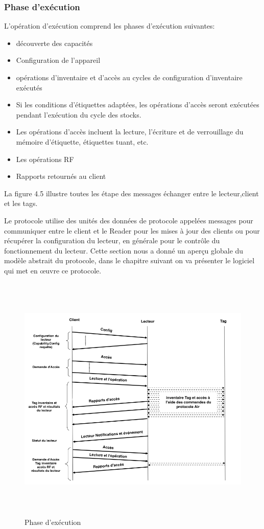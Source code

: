 \documentclass[11pt, a4paper, twoside]{book}
\begin{document}
\subsubsection{Phase d'exécution}
L'opération d'exécution comprend les phases d'exécution suivantes:
\begin{itemize}
\item découverte des capacités
\item Configuration de l'appareil
\item opérations d'inventaire et d'accès au cycles de configuration d'inventaire exécutés
\item Si les conditions d'étiquettes adaptées, les opérations d'accès seront exécutées pendant l'exécution du cycle des stocks.
\item Les opérations d'accès incluent la lecture, l'écriture et de verrouillage du mémoire d'étiquette, étiquettes tuant, etc.
\item Les opérations RF
\item Rapports retournés au client
\end{itemize}

La figure 4.5 illustre toutes les étape des messages échanger entre le lecteur,client et les tags.

Le protocole utilise des unités des données de protocole appelées messages pour communiquer entre le client et le Reader pour  les mises à jour des clients ou pour récupérer la configuration du lecteur, en générale pour le contrôle du fonctionnement du lecteur. Cette section nous a donné un aperçu globale du modèle abstrait du protocole, dans le chapitre suivant on va présenter le logiciel qui met en œuvre ce protocole.
\begin{figure}[!h]
\centering
\includegraphics[height=12cm]{runtime}
\caption{Phase d'exécution}
\end{figure}
\pagebreak
\end{document}
